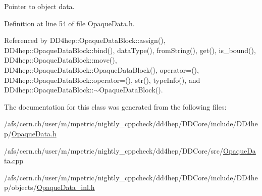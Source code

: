 Pointer to object data. 



Definition at line 54 of file Opaque\+Data.\+h.



Referenced by D\+D4hep\+::\+Opaque\+Data\+Block\+::assign(), D\+D4hep\+::\+Opaque\+Data\+Block\+::bind(), data\+Type(), from\+String(), get(), is\+\_\+bound(), D\+D4hep\+::\+Opaque\+Data\+Block\+::move(), D\+D4hep\+::\+Opaque\+Data\+Block\+::\+Opaque\+Data\+Block(), operator=(), D\+D4hep\+::\+Opaque\+Data\+Block\+::operator=(), str(), type\+Info(), and D\+D4hep\+::\+Opaque\+Data\+Block\+::$\sim$\+Opaque\+Data\+Block().



The documentation for this class was generated from the following files\+:\begin{DoxyCompactItemize}
\item 
/afs/cern.\+ch/user/m/mpetric/nightly\+\_\+cppcheck/dd4hep/\+D\+D\+Core/include/\+D\+D4hep/\hyperlink{_opaque_data_8h}{Opaque\+Data.\+h}\item 
/afs/cern.\+ch/user/m/mpetric/nightly\+\_\+cppcheck/dd4hep/\+D\+D\+Core/src/\hyperlink{_opaque_data_8cpp}{Opaque\+Data.\+cpp}\item 
/afs/cern.\+ch/user/m/mpetric/nightly\+\_\+cppcheck/dd4hep/\+D\+D\+Core/include/\+D\+D4hep/objects/\hyperlink{_opaque_data__inl_8h}{Opaque\+Data\+\_\+inl.\+h}\end{DoxyCompactItemize}
